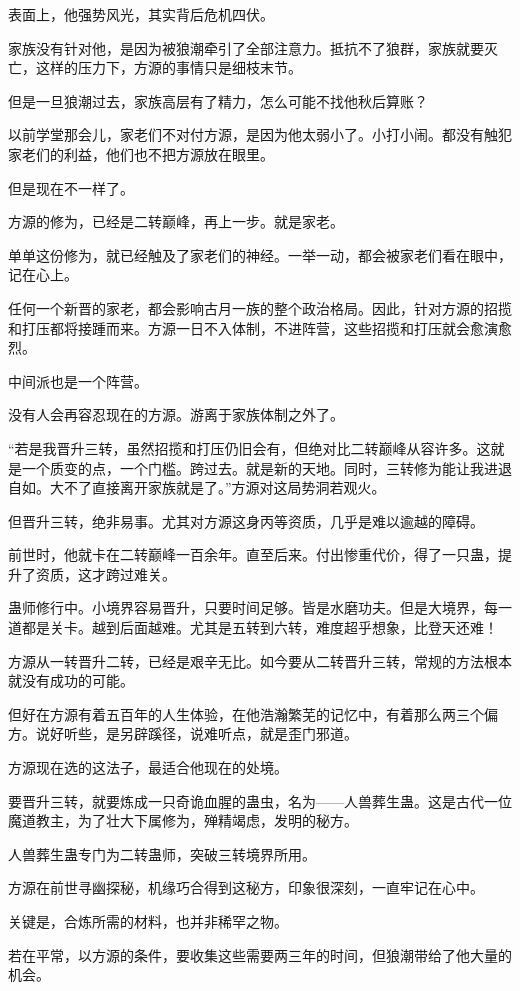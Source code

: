 \begin{this_body}
表面上，他强势风光，其实背后危机四伏。

家族没有针对他，是因为被狼潮牵引了全部注意力。抵抗不了狼群，家族就要灭亡，这样的压力下，方源的事情只是细枝末节。

但是一旦狼潮过去，家族高层有了精力，怎么可能不找他秋后算账？

以前学堂那会儿，家老们不对付方源，是因为他太弱小了。小打小闹。都没有触犯家老们的利益，他们也不把方源放在眼里。

但是现在不一样了。

方源的修为，已经是二转巅峰，再上一步。就是家老。

单单这份修为，就已经触及了家老们的神经。一举一动，都会被家老们看在眼中，记在心上。

任何一个新晋的家老，都会影响古月一族的整个政治格局。因此，针对方源的招揽和打压都将接踵而来。方源一日不入体制，不进阵营，这些招揽和打压就会愈演愈烈。

中间派也是一个阵营。

没有人会再容忍现在的方源。游离于家族体制之外了。

“若是我晋升三转，虽然招揽和打压仍旧会有，但绝对比二转巅峰从容许多。这就是一个质变的点，一个门槛。跨过去。就是新的天地。同时，三转修为能让我进退自如。大不了直接离开家族就是了。”方源对这局势洞若观火。

但晋升三转，绝非易事。尤其对方源这身丙等资质，几乎是难以逾越的障碍。

前世时，他就卡在二转巅峰一百余年。直至后来。付出惨重代价，得了一只蛊，提升了资质，这才跨过难关。

蛊师修行中。小境界容易晋升，只要时间足够。皆是水磨功夫。但是大境界，每一道都是关卡。越到后面越难。尤其是五转到六转，难度超乎想象，比登天还难！

方源从一转晋升二转，已经是艰辛无比。如今要从二转晋升三转，常规的方法根本就没有成功的可能。

但好在方源有着五百年的人生体验，在他浩瀚繁芜的记忆中，有着那么两三个偏方。说好听些，是另辟蹊径，说难听点，就是歪门邪道。

方源现在选的这法子，最适合他现在的处境。

要晋升三转，就要炼成一只奇诡血腥的蛊虫，名为——人兽葬生蛊。这是古代一位魔道教主，为了壮大下属修为，殚精竭虑，发明的秘方。

人兽葬生蛊专门为二转蛊师，突破三转境界所用。

方源在前世寻幽探秘，机缘巧合得到这秘方，印象很深刻，一直牢记在心中。

关键是，合炼所需的材料，也并非稀罕之物。

若在平常，以方源的条件，要收集这些需要两三年的时间，但狼潮带给了他大量的机会。


\end{this_body}
